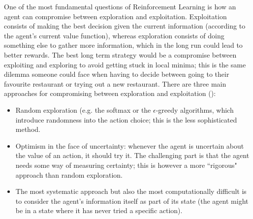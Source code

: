 One of the most fundamental questions of Reinforcement Learning is how an agent can compromise between exploration and exploitation. Exploitation consists of making the best decision given the current information (according to the agent's current value function), whereas exploration consists of doing something else to gather more information, which in the long run could lead to better rewards. \newline
The best long term strategy would be a compromise between exploiting and exploring to avoid getting stuck in local minima; this is the same dilemma someone could face when having to decide between going to their favourite restaurant or trying out a new restaurant. There are three main approaches for compromising between exploration and exploitation (\cite{silver2015}): 
\begin{itemize}
	\item Random exploration (e.g. the softmax or the $\epsilon$-greedy algorithms, which introduce randomness into the action choice; this is the less sophisticated method.
	\item Optimism in the face of uncertainty: whenever the agent is uncertain about the value of an action, it should try it. The challenging part is that the agent needs some way of measuring certainty; this is however a more ``rigorous" approach than random exploration.
	\item The most systematic approach but also the most computationally difficult is to consider the agent's information itself as part of its state (the agent might be in a state where it has never tried a specific action).
\end{itemize}


